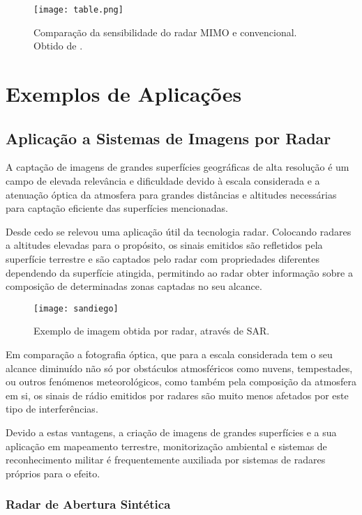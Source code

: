 \documentclass[purist,portuguese]{ist-report}
\begin{document}
\begin{figure}[ht]
  \centering
  \texttt{[image: table.png]}
  \caption{Comparação da sensibilidade do radar MIMO e convencional. Obtido de \cite{mimoradarbook}.}
  \label{fig:tabela}
\end{figure}

\section{Exemplos de Aplicações}

\subsection{Aplicação a Sistemas de Imagens por Radar}

A captação de imagens de grandes superfícies geográficas de alta resolução é um campo de elevada relevância e dificuldade devido à escala considerada e a atenuação óptica da atmosfera para grandes distâncias e altitudes necessárias para captação eficiente das superfícies mencionadas.

Desde cedo se relevou uma aplicação útil da tecnologia radar. Colocando radares a altitudes elevadas para o propósito, os sinais emitidos são refletidos pela superfície terrestre e são captados pelo radar com propriedades diferentes dependendo da superfície atingida, permitindo ao radar obter informação sobre a composição de determinadas zonas captadas no seu alcance.

\begin{figure}[ht]
	\centering
	\texttt{[image: sandiego]}
	\caption{Exemplo de imagem obtida por radar, através de SAR.}
	\label{fig:sandiego}
\end{figure}

Em comparação a fotografia óptica, que para a escala considerada tem o seu alcance diminuído não só por obstáculos atmosféricos como nuvens, tempestades, ou outros fenómenos meteorológicos, como também pela composição da atmosfera em si, os sinais de rádio emitidos por radares são muito menos afetados por este tipo de interferências.

Devido a estas vantagens, a criação de imagens de grandes superfícies e a sua aplicação em mapeamento terrestre, monitorização ambiental e sistemas de reconhecimento militar é frequentemente auxiliada por sistemas de radares próprios para o efeito.

\subsubsection{Radar de Abertura Sintética}
\end{document}
